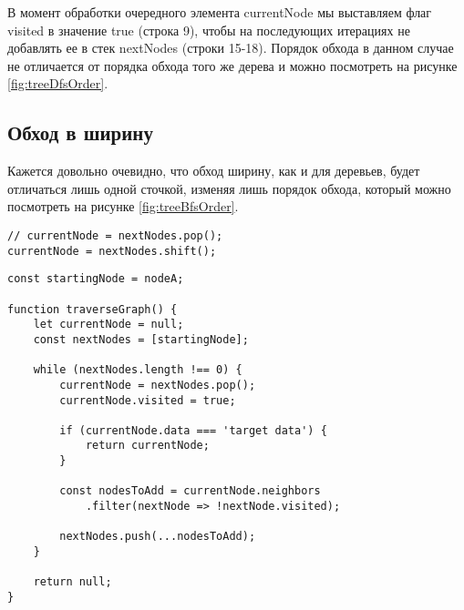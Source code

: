 \documentclass[../article.tex]{subfiles}
\begin{document}
В момент обработки очередного элемента {\firacodebold currentNode} мы выставляем флаг {\firacodebold visited} в значение {\firacodebold true} (строка 9), чтобы на последующих итерациях не добавлять ее в стек {\firacodebold nextNodes} (строки 15-18). Порядок обхода в данном случае не отличается от порядка обхода того же дерева и можно посмотреть на рисунке \ref{fig:treeDfsOrder}.

\subsection{Обход в ширину}

Кажется довольно очевидно, что обход ширину, как и для деревьев, будет отличаться лишь одной сточкой, изменяя лишь порядок обхода, который можно посмотреть на рисунке \ref{fig:treeBfsOrder}.

\begin{ruledelement}
    \begin{lstlisting}[caption={Отличие обхода в ширину от обхода в глубину}, label={lst:graphBfsDiff}]
// currentNode = nextNodes.pop();
currentNode = nextNodes.shift();
    \end{lstlisting}
\end{ruledelement}

\begin{figure*}
    \begin{ruledelement}
        \begin{lstlisting}[caption={Обход графа в глубину}, label={lst:graphDfs}]
const startingNode = nodeA;

function traverseGraph() {
    let currentNode = null;
    const nextNodes = [startingNode];

    while (nextNodes.length !== 0) {
        currentNode = nextNodes.pop();
        currentNode.visited = true;

        if (currentNode.data === 'target data') {
            return currentNode;
        }

        const nodesToAdd = currentNode.neighbors
            .filter(nextNode => !nextNode.visited);

        nextNodes.push(...nodesToAdd);
    }

    return null;
}
        \end{lstlisting}
    \end{ruledelement}

\end{figure*}
\end{document}
